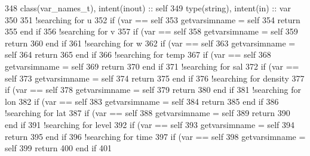\begin{DoxyCode}
348     \textcolor{keywordtype}{class}(var\_names\_t), \textcolor{keywordtype}{intent(inout)} :: self
349     \textcolor{keywordtype}{type}(string), \textcolor{keywordtype}{intent(in)} :: var
350 
351     \textcolor{comment}{!searching for u}
352     \textcolor{keywordflow}{if} (var == self%
353         getvarsimname = self%
354         \textcolor{keywordflow}{return}
355 \textcolor{keywordflow}{    end if}
356     \textcolor{comment}{!searching for v}
357     \textcolor{keywordflow}{if} (var == self%
358         getvarsimname = self%
359         \textcolor{keywordflow}{return}
360 \textcolor{keywordflow}{    end if}
361     \textcolor{comment}{!searching for w}
362     \textcolor{keywordflow}{if} (var == self%
363         getvarsimname = self%
364         \textcolor{keywordflow}{return}
365 \textcolor{keywordflow}{    end if}
366     \textcolor{comment}{!searching for temp}
367     \textcolor{keywordflow}{if} (var == self%
368         getvarsimname = self%
369         \textcolor{keywordflow}{return}
370 \textcolor{keywordflow}{    end if}
371     \textcolor{comment}{!searching for sal}
372     \textcolor{keywordflow}{if} (var == self%
373         getvarsimname = self%
374         \textcolor{keywordflow}{return}
375 \textcolor{keywordflow}{    end if}
376     \textcolor{comment}{!searching for density}
377     \textcolor{keywordflow}{if} (var == self%
378         getvarsimname = self%
379         \textcolor{keywordflow}{return}
380 \textcolor{keywordflow}{    end if}
381     \textcolor{comment}{!searching for lon}
382     \textcolor{keywordflow}{if} (var == self%
383         getvarsimname = self%
384         \textcolor{keywordflow}{return}
385 \textcolor{keywordflow}{    end if}
386     \textcolor{comment}{!searching for lat}
387     \textcolor{keywordflow}{if} (var == self%
388         getvarsimname = self%
389         \textcolor{keywordflow}{return}
390 \textcolor{keywordflow}{    end if}
391     \textcolor{comment}{!searching for level}
392     \textcolor{keywordflow}{if} (var == self%
393         getvarsimname = self%
394         \textcolor{keywordflow}{return}
395 \textcolor{keywordflow}{    end if}
396     \textcolor{comment}{!searching for time}
397     \textcolor{keywordflow}{if} (var == self%
398         getvarsimname = self%
399         \textcolor{keywordflow}{return}
400 \textcolor{keywordflow}{    end if}
401 
\end{DoxyCode}
